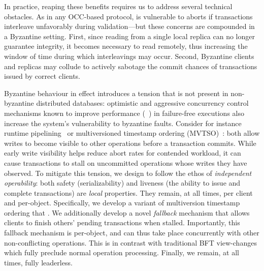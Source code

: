 In practice, reaping these benefits requires us to address several
technical obstacles. As in any OCC-based protocol, \sys
is vulnerable to aborts if transactions interleave unfavorably during
validation---but these concerns are compounded in a Byzantine
setting. First, since reading from a single local replica can no
longer guarantee integrity, it becomes necessary to read remotely,
thus increasing the window of time during which 
interleavings may occur. Second, Byzantine clients and replicas may
collude to actively sabotage the commit chances of transactions issued
by correct clients. 

Byzantine behaviour in effect introduces a tension that is not present in non-byzantine
distributed databases: optimistic and aggressive concurrency control mechanisms known
to improve performance (~\cite{kung1981occ,bernstein1983mcc,reed1983atomic,xie2015callas,zhang2015tapir}) in failure-free executions also increase the system's vulnerability to byzantine faults. Consider for instance runtime pipelining~\cite{xie2015callas,su2017tebaldi} or multiversioned timestamp ordering (MVTSO)~\cite{bernstein1983mcc,reed1983atomic}: both allow writes to become visible to other operations before a transaction commits. While early write visibility helps reduce abort rates for
contended workload, it can cause transactions to stall on uncommitted operations whose writes they have observed. To mitigate this tension, we design \sys{} to follow the ethos of \textit{independent operability}: both safety (serializability) and liveness (the ability to issue and complete transactions) are \textit{local} properties. They remain, at all times, per client and per-object. Specifically, we develop a variant of multiversion timestamp ordering that . 
 We additionally develop a novel \textit{fallback} mechanism that allows clients to finish others' pending transactions when stalled. Importantly, this fallback mechanism is per-object, and can thus take place concurrently with other non-conflicting operations. This is in contrast with traditional BFT view-changes which fully preclude normal operation processing.  Finally, we remain, at all times, fully leaderless. 

